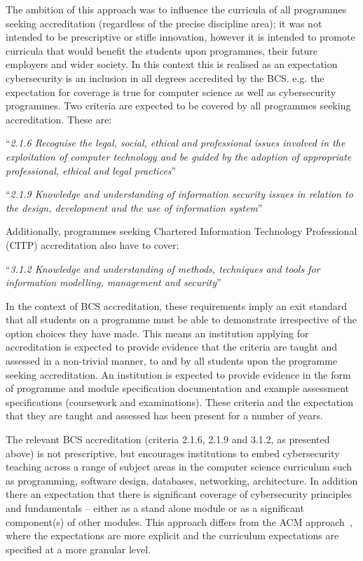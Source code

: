 \documentclass[conference]{IEEEtran}
\begin{document}
{The ambition of this approach was to influence the curricula of all programmes seeking accreditation (regardless of the precise discipline area); it was not intended to be prescriptive or stifle innovation, however it is intended to promote curricula that would benefit the students upon programmes, their future employers and wider society.  In this context this is realised as an expectation cybersecurity is an inclusion in all degrees accredited by the BCS. e.g. the expectation for coverage is true for computer science as well as cybersecurity programmes. Two criteria are expected to be covered by all programmes seeking accreditation. These are:

``{\emph{2.1.6 Recognise the legal, social, ethical and professional issues involved in the exploitation of computer technology and be guided by the adoption of appropriate professional, ethical and legal practices}}''

``{\emph{2.1.9 Knowledge and understanding of information security issues in relation to the design, development and the use of information system}}''~\cite{BCS2018a}

Additionally, programmes seeking Chartered Information Technology Professional (CITP) accreditation also have to cover:

``{\emph{3.1.2 Knowledge and understanding of methods, techniques and tools for information modelling, management and security}}''~\cite{BCS2018a}

In the context of BCS accreditation, these requirements imply an exit standard that all students on a programme must be able to demonstrate irrespective of the option choices they have made. This means an institution applying for accreditation is expected to provide evidence that the criteria are taught and assessed in a non-trivial manner, to and by all students upon the programme seeking accreditation. An institution is expected to provide evidence in the form of programme and module specification documentation and example assessment specifications (coursework and examinations). These criteria and the expectation that they are taught and assessed has been present for a number of years.

The relevant BCS accreditation (criteria 2.1.6, 2.1.9 and 3.1.2, as presented above) is not prescriptive, but encourages institutions to embed cybersecurity teaching across a range of subject areas in the computer science curriculum such as programming, software design, databases, networking, architecture. In addition there an expectation that there is significant coverage of cybersecurity principles and fundamentals -- either as a stand alone module or as a significant component(s) of other modules. This approach differs from the ACM approach~\cite{ACM2013a}, where the expectations are more explicit and the curriculum expectations are specified at a more granular level.

}
\end{document}
